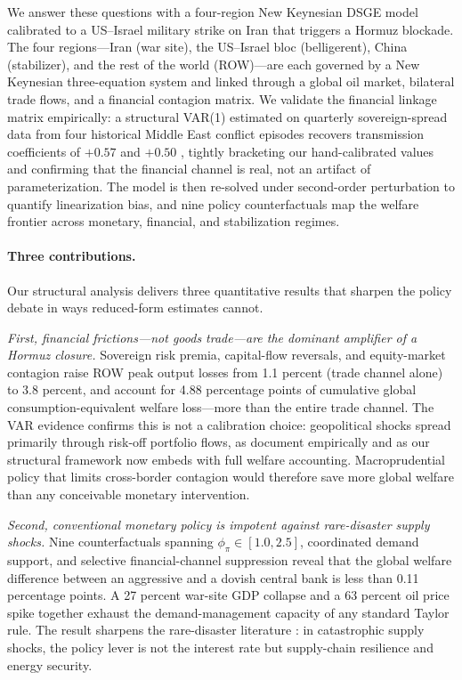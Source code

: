 \documentclass[12pt]{article}
\begin{document}
We answer these questions with a four-region New Keynesian DSGE model calibrated to a US--Israel military strike on Iran that triggers a Hormuz blockade. The four regions---Iran (war site), the US--Israel bloc (belligerent), China (stabilizer), and the rest of the world (ROW)---are each governed by a New Keynesian three-equation system and linked through a global oil market, bilateral trade flows, and a financial contagion matrix. We validate the financial linkage matrix empirically: a structural VAR(1) estimated on quarterly sovereign-spread data from four historical Middle East conflict episodes recovers transmission coefficients of $+0.57$ and $+0.50$ , tightly bracketing our hand-calibrated values and confirming that the financial channel is real, not an artifact of parameterization. The model is then re-solved under second-order perturbation to quantify linearization bias, and nine policy counterfactuals map the welfare frontier across monetary, financial, and stabilization regimes.

\paragraph{Three contributions.} Our structural analysis delivers three quantitative results that sharpen the policy debate in ways reduced-form estimates cannot.

\textit{First, financial frictions---not goods trade---are the dominant amplifier of a Hormuz closure.} Sovereign risk premia, capital-flow reversals, and equity-market contagion raise ROW peak output losses from 1.1 percent (trade channel alone) to 3.8 percent, and account for 4.88 percentage points of cumulative global consumption-equivalent welfare loss---more than the entire trade channel. The VAR evidence confirms this is not a calibration choice: geopolitical shocks spread primarily through risk-off portfolio flows, as \citet{caldara2022measuring} document empirically and as our structural framework now embeds with full welfare accounting. Macroprudential policy that limits cross-border contagion would therefore save more global welfare than any conceivable monetary intervention.

\textit{Second, conventional monetary policy is impotent against rare-disaster supply shocks.} Nine counterfactuals spanning $\phi_\pi \in [1.0, 2.5]$, coordinated demand support, and selective financial-channel suppression reveal that the global welfare difference between an aggressive and a dovish central bank is less than 0.11 percentage points. A 27 percent war-site GDP collapse and a 63 percent oil price spike together exhaust the demand-management capacity of any standard Taylor rule. The result sharpens the rare-disaster literature \citep{barro2006rare}: in catastrophic supply shocks, the policy lever is not the interest rate but supply-chain resilience and energy security.
\end{document}
